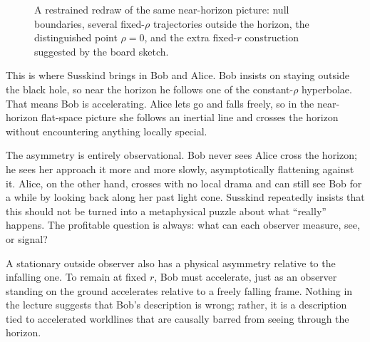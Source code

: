 \begin{figure}[h]
\centering
{}
\caption{A restrained redraw of the same near-horizon picture: null boundaries, several fixed-\(\rho\) trajectories outside the horizon, the distinguished point \(\rho=0\), and the extra fixed-\(r\) construction suggested by the board sketch.}
\end{figure}

This is where Susskind brings in Bob and Alice. Bob insists on staying outside the black hole, so near the horizon he follows one of the constant-\(\rho\) hyperbolae. That means Bob is accelerating. Alice lets go and falls freely, so in the near-horizon flat-space picture she follows an inertial line and crosses the horizon without encountering anything locally special.

The asymmetry is entirely observational. Bob never sees Alice cross the horizon; he sees her approach it more and more slowly, asymptotically flattening against it. Alice, on the other hand, crosses with no local drama and can still see Bob for a while by looking back along her past light cone. Susskind repeatedly insists that this should not be turned into a metaphysical puzzle about what ``really'' happens. The profitable question is always: what can each observer measure, see, or signal?

A stationary outside observer also has a physical asymmetry relative to the infalling one. To remain at fixed \(r\), Bob must accelerate, just as an observer standing on the ground accelerates relative to a freely falling frame. Nothing in the lecture suggests that Bob's description is wrong; rather, it is a description tied to accelerated worldlines that are causally barred from seeing through the horizon.

